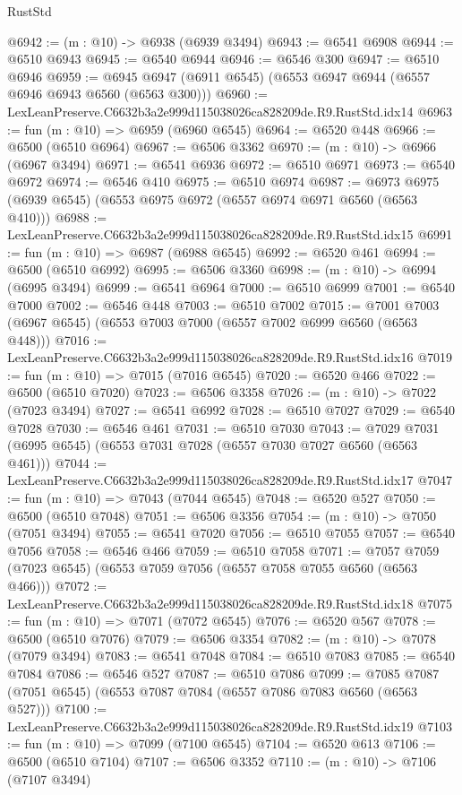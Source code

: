 \begin{lexlean}{RustStd}
\begin{coremodule}
@6942 := (m : @10) -> @6938 (@6939 @3494)
@6943 := @6541 @6908
@6944 := @6510 @6943
@6945 := @6540 @6944
@6946 := @6546 @300
@6947 := @6510 @6946
@6959 := @6945 @6947 (@6911 @6545) (@6553 @6947 @6944 (@6557 @6946 @6943 @6560 (@6563 @300)))
@6960 := LexLeanPreserve.C6632b3a2e999d115038026ca828209de.R9.RustStd.idx14
@6963 := fun (m : @10) => @6959 (@6960 @6545)
@6964 := @6520 @448
@6966 := @6500 (@6510 @6964)
@6967 := @6506 @3362
@6970 := (m : @10) -> @6966 (@6967 @3494)
@6971 := @6541 @6936
@6972 := @6510 @6971
@6973 := @6540 @6972
@6974 := @6546 @410
@6975 := @6510 @6974
@6987 := @6973 @6975 (@6939 @6545) (@6553 @6975 @6972 (@6557 @6974 @6971 @6560 (@6563 @410)))
@6988 := LexLeanPreserve.C6632b3a2e999d115038026ca828209de.R9.RustStd.idx15
@6991 := fun (m : @10) => @6987 (@6988 @6545)
@6992 := @6520 @461
@6994 := @6500 (@6510 @6992)
@6995 := @6506 @3360
@6998 := (m : @10) -> @6994 (@6995 @3494)
@6999 := @6541 @6964
@7000 := @6510 @6999
@7001 := @6540 @7000
@7002 := @6546 @448
@7003 := @6510 @7002
@7015 := @7001 @7003 (@6967 @6545) (@6553 @7003 @7000 (@6557 @7002 @6999 @6560 (@6563 @448)))
@7016 := LexLeanPreserve.C6632b3a2e999d115038026ca828209de.R9.RustStd.idx16
@7019 := fun (m : @10) => @7015 (@7016 @6545)
@7020 := @6520 @466
@7022 := @6500 (@6510 @7020)
@7023 := @6506 @3358
@7026 := (m : @10) -> @7022 (@7023 @3494)
@7027 := @6541 @6992
@7028 := @6510 @7027
@7029 := @6540 @7028
@7030 := @6546 @461
@7031 := @6510 @7030
@7043 := @7029 @7031 (@6995 @6545) (@6553 @7031 @7028 (@6557 @7030 @7027 @6560 (@6563 @461)))
@7044 := LexLeanPreserve.C6632b3a2e999d115038026ca828209de.R9.RustStd.idx17
@7047 := fun (m : @10) => @7043 (@7044 @6545)
@7048 := @6520 @527
@7050 := @6500 (@6510 @7048)
@7051 := @6506 @3356
@7054 := (m : @10) -> @7050 (@7051 @3494)
@7055 := @6541 @7020
@7056 := @6510 @7055
@7057 := @6540 @7056
@7058 := @6546 @466
@7059 := @6510 @7058
@7071 := @7057 @7059 (@7023 @6545) (@6553 @7059 @7056 (@6557 @7058 @7055 @6560 (@6563 @466)))
@7072 := LexLeanPreserve.C6632b3a2e999d115038026ca828209de.R9.RustStd.idx18
@7075 := fun (m : @10) => @7071 (@7072 @6545)
@7076 := @6520 @567
@7078 := @6500 (@6510 @7076)
@7079 := @6506 @3354
@7082 := (m : @10) -> @7078 (@7079 @3494)
@7083 := @6541 @7048
@7084 := @6510 @7083
@7085 := @6540 @7084
@7086 := @6546 @527
@7087 := @6510 @7086
@7099 := @7085 @7087 (@7051 @6545) (@6553 @7087 @7084 (@6557 @7086 @7083 @6560 (@6563 @527)))
@7100 := LexLeanPreserve.C6632b3a2e999d115038026ca828209de.R9.RustStd.idx19
@7103 := fun (m : @10) => @7099 (@7100 @6545)
@7104 := @6520 @613
@7106 := @6500 (@6510 @7104)
@7107 := @6506 @3352
@7110 := (m : @10) -> @7106 (@7107 @3494)

\end{coremodule}
\end{lexlean}
